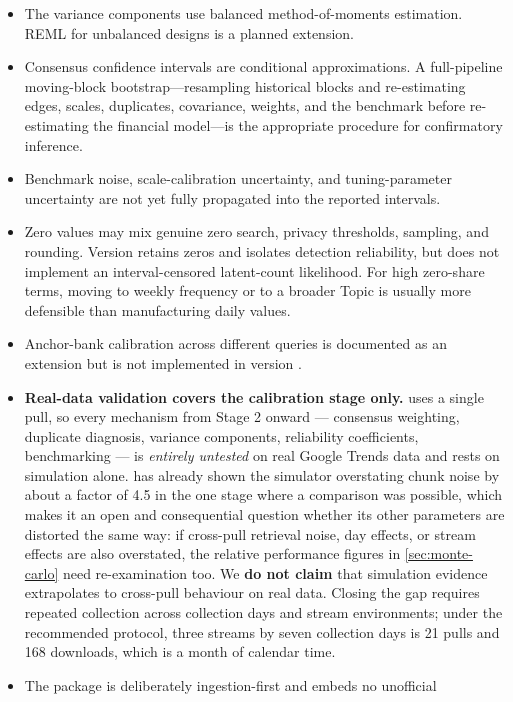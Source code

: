 \documentclass[12pt,a4paper,oneside]{article}
\begin{document}
\begin{itemize}
\item The variance components use balanced method-of-moments estimation. REML
for unbalanced designs is a planned extension.
\item Consensus confidence intervals are conditional approximations. A
full-pipeline moving-block bootstrap---resampling historical blocks and
re-estimating edges, scales, duplicates, covariance, weights, and the benchmark
before re-estimating the financial model---is the appropriate procedure for
confirmatory inference.
\item Benchmark noise, scale-calibration uncertainty, and tuning-parameter
uncertainty are not yet fully propagated into the reported intervals.
\item Zero values may mix genuine zero search, privacy thresholds, sampling, and
rounding. Version \racerversion{} retains zeros and isolates detection
reliability, but does not implement an interval-censored latent-count
likelihood. For high zero-share terms, moving to weekly frequency or to a
broader Topic is usually more defensible than manufacturing daily values.
\item Anchor-bank calibration across different queries is documented as an
extension but is not implemented in version \racerversion{}.
\item \textbf{Real-data validation covers the calibration stage only.}
 uses a single pull, so every mechanism from Stage 2 onward
--- consensus weighting, duplicate diagnosis, variance components, reliability
coefficients, benchmarking --- is \emph{entirely untested} on real Google Trends
data and rests on simulation alone.  has already shown the
simulator overstating chunk noise by about a factor of 4.5 in the one stage where
a comparison was possible, which makes it an open and consequential question
whether its other parameters are distorted the same way: if cross-pull retrieval
noise, day effects, or stream effects are also overstated, the relative
performance figures in \cref{sec:monte-carlo} need re-examination too. We
\textbf{do not claim} that simulation evidence extrapolates to cross-pull
behaviour on real data. Closing the gap requires repeated collection across
collection days and stream environments; under the recommended protocol, three
streams by seven collection days is 21 pulls and 168 downloads, which is a
month of calendar time.
\item The package is deliberately ingestion-first and embeds no unofficial

\end{itemize}
\end{document}
